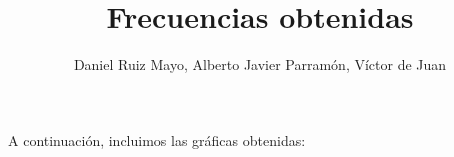 \documentclass[palatino,nochap]{apuntes}
\title{Frecuencias obtenidas}
\author{Daniel Ruiz Mayo, Alberto Javier Parramón, Víctor de Juan}
\date{}
\begin{document}
\pagestyle{plain}
\maketitle
A continuación, incluimos las gráficas obtenidas:



\appendix
\end{document}
